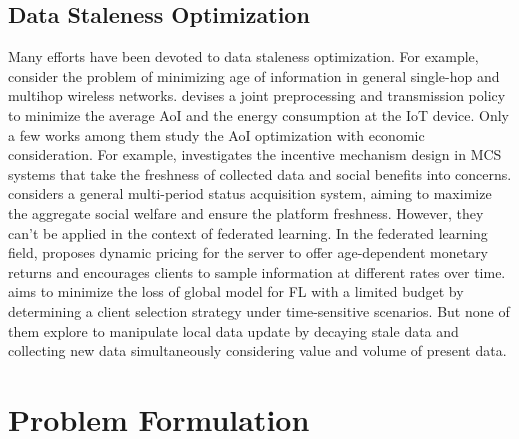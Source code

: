 \documentclass{article}
\theoremstyle{plain}
\theoremstyle{definition}
\theoremstyle{remark}
\begin{document}
\subsection{Data Staleness Optimization}
Many efforts have been devoted to data staleness optimization.
For example, \cite{tripathi2021age} consider the problem of minimizing age of information in general single-hop and multihop wireless networks.
\cite{fang2021computing} devises a joint preprocessing and transmission policy to minimize the average AoI and the energy consumption at the IoT device.
Only a few works among them study the AoI optimization with economic consideration. For example, \cite{xiao2023aoi} investigates the incentive mechanism design in MCS systems that take the freshness of collected data and social benefits into concerns.
\cite{wang2021taming} considers a general multi-period status acquisition system, aiming to maximize the aggregate social welfare and ensure the platform freshness.
However, they can't be applied in the context of federated learning.
In the federated learning field, \cite{wang2019dynamic} proposes dynamic pricing for the server to offer age-dependent monetary returns and encourages clients to sample information at different rates over time.
\cite{wu2023towards} aims to minimize the loss of global model for FL with a limited budget by determining a client selection strategy under time-sensitive scenarios.
But none of them explore to manipulate local data update by decaying stale data and collecting new data simultaneously considering value and volume of present data. 

\section{Problem Formulation}
\end{document}
